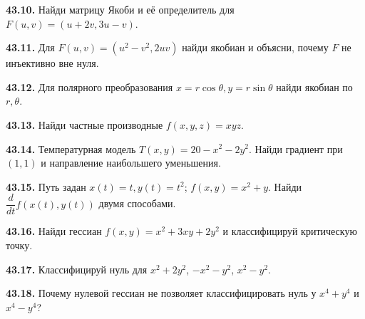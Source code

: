 \noindent\begin{minipage}[t]{\linewidth}\textbf{43.10.} Найди матрицу Якоби и её определитель для \(F(u,v)=(u+2v,3u-v)\).\par\end{minipage}\par
\noindent\begin{minipage}[t]{\linewidth}\textbf{43.11.} Для \(F(u,v)=(u^2-v^2,2uv)\) найди якобиан и объясни, почему \(F\) не инъективно вне нуля.\par\end{minipage}\par
\noindent\begin{minipage}[t]{\linewidth}\textbf{43.12.} Для полярного преобразования \(x=r\cos\theta,y=r\sin\theta\) найди якобиан по \(r,\theta\).\par\end{minipage}\par
\noindent\begin{minipage}[t]{\linewidth}\textbf{43.13.} Найди частные производные \(f(x,y,z)=xyz\).\par\end{minipage}\par
\noindent\begin{minipage}[t]{\linewidth}\textbf{43.14.} Температурная модель \(T(x,y)=20-x^2-2y^2\). Найди градиент при \((1,1)\) и направление наибольшего уменьшения.\par\end{minipage}\par
\noindent\begin{minipage}[t]{\linewidth}\textbf{43.15.} Путь задан \(x(t)=t,y(t)=t^2\); \(f(x,y)=x^2+y\). Найди \(\dfrac d{dt}f(x(t),y(t))\) двумя способами.\par\end{minipage}\par
\noindent\begin{minipage}[t]{\linewidth}\textbf{43.16.} Найди гессиан \(f(x,y)=x^2+3xy+2y^2\) и классифицируй критическую точку.\par\end{minipage}\par
\noindent\begin{minipage}[t]{\linewidth}\textbf{43.17.} Классифицируй нуль для \(x^2+2y^2\), \(-x^2-y^2\), \(x^2-y^2\).\par\end{minipage}\par
\noindent\begin{minipage}[t]{\linewidth}\textbf{43.18.} Почему нулевой гессиан не позволяет классифицировать нуль у \(x^4+y^4\) и \(x^4-y^4\)?\par\end{minipage}\par
